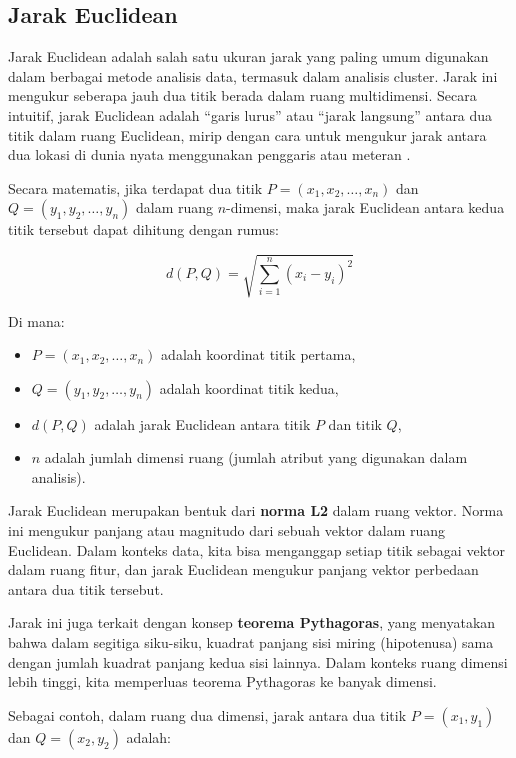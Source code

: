 \documentclass[
  oneside]{book}
\begin{document}
\subsection{Jarak Euclidean}\label{jarak-euclidean}

Jarak Euclidean adalah salah satu ukuran jarak yang paling umum digunakan dalam berbagai metode analisis data, termasuk dalam analisis cluster. Jarak ini mengukur seberapa jauh dua titik berada dalam ruang multidimensi. Secara intuitif, jarak Euclidean adalah ``garis lurus'' atau ``jarak langsung'' antara dua titik dalam ruang Euclidean, mirip dengan cara untuk mengukur jarak antara dua lokasi di dunia nyata menggunakan penggaris atau meteran \citep{everitt2011cluster}.

Secara matematis, jika terdapat dua titik \(P = (x_1, x_2, \dots, x_n)\) dan \(Q = (y_1, y_2, \dots, y_n)\) dalam ruang \(n\)-dimensi, maka jarak Euclidean antara kedua titik tersebut dapat dihitung dengan rumus:

\[
d(P, Q) = \sqrt{\sum_{i=1}^{n} (x_i - y_i)^2}
\]

Di mana:

\begin{itemize}
\item
  \(P = (x_1, x_2, \dots, x_n)\) adalah koordinat titik pertama,
\item
  \(Q = (y_1, y_2, \dots, y_n)\) adalah koordinat titik kedua,
\item
  \(d(P, Q)\) adalah jarak Euclidean antara titik \(P\) dan titik \(Q\),
\item
  \(n\) adalah jumlah dimensi ruang (jumlah atribut yang digunakan dalam analisis).
\end{itemize}

Jarak Euclidean merupakan bentuk dari \textbf{norma L2} dalam ruang vektor. Norma ini mengukur panjang atau magnitudo dari sebuah vektor dalam ruang Euclidean. Dalam konteks data, kita bisa menganggap setiap titik sebagai vektor dalam ruang fitur, dan jarak Euclidean mengukur panjang vektor perbedaan antara dua titik tersebut.

Jarak ini juga terkait dengan konsep \textbf{teorema Pythagoras}, yang menyatakan bahwa dalam segitiga siku-siku, kuadrat panjang sisi miring (hipotenusa) sama dengan jumlah kuadrat panjang kedua sisi lainnya. Dalam konteks ruang dimensi lebih tinggi, kita memperluas teorema Pythagoras ke banyak dimensi.

Sebagai contoh, dalam ruang dua dimensi, jarak antara dua titik \(P = (x_1, y_1)\) dan \(Q = (x_2, y_2)\) adalah:
\end{document}

